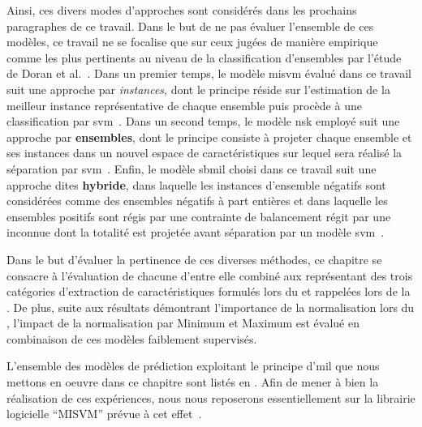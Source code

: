 Ainsi, ces divers modes d'approches sont considérés dans les prochains paragraphes de ce travail. Dans le but de ne pas évaluer l'ensemble de ces modèles, ce travail ne se focalise que sur ceux jugées de manière empirique comme les plus pertinents au niveau de la classification d'ensembles par l'étude de Doran et al.~\cite{Doran2014}. Dans un premier temps, le modèle \gls{misvm} évalué dans ce travail suit une approche par \textit{instances}, dont le principe réside sur l'estimation de la meilleur instance représentative de chaque ensemble puis procède à une classification par \gls{svm}~\cite{Andrews2003}. Dans un second temps, le modèle \gls{nsk} employé suit une approche par \textbf{ensembles}, dont le principe consiste à projeter chaque ensemble et ses instances dans un nouvel espace de caractéristiques sur lequel sera réalisé la séparation par \gls{svm}~\cite{Gartner2002}. Enfin, le modèle \gls{sbmil} choisi dans ce travail suit une approche dites \textbf{hybride}, dans laquelle les instances d'ensemble négatifs sont considérées comme des ensembles négatifs à part entières et dans laquelle les ensembles positifs sont régis par une contrainte de balancement régit par une inconnue dont la totalité est projetée avant séparation par un modèle \gls{svm}~\cite{Bunescu2007}.\par

Dans le but d'évaluer la pertinence de ces diverses méthodes, ce chapitre se consacre à l'évaluation de chacune d'entre elle combiné aux représentant des trois catégories d'extraction de caractéristiques formulés lors du  et rappelées lors de la . De plus, suite aux résultats démontrant l'importance de la normalisation lors du , l'impact de la normalisation par Minimum et Maximum est évalué en combinaison de ces modèles faiblement supervisés.\par

L'ensemble des modèles de prédiction exploitant le principe d'\gls{mil} que nous mettons en oeuvre dans ce chapitre sont listés en . Afin de mener à bien la réalisation de ces expériences, nous nous reposerons essentiellement sur la librairie logicielle “MISVM” prévue à cet effet~\cite{Doran2014}.\par

